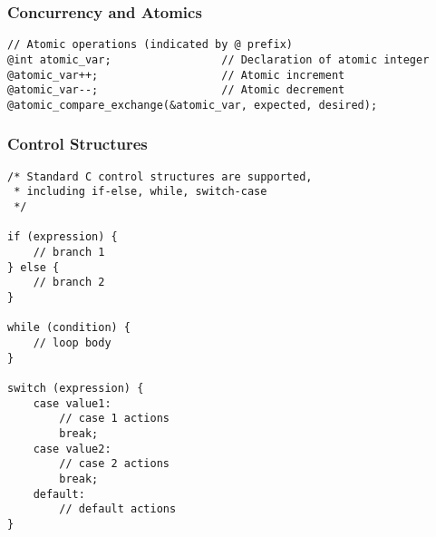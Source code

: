 \documentclass[12pt,a4paper]{article} %
\begin{document}
\subsubsection*{Concurrency and Atomics}
\begin{verbatim}
// Atomic operations (indicated by @ prefix)
@int atomic_var;                 // Declaration of atomic integer
@atomic_var++;                   // Atomic increment
@atomic_var--;                   // Atomic decrement
@atomic_compare_exchange(&atomic_var, expected, desired);

\end{verbatim}

\subsubsection*{Control Structures}
\begin{verbatim}
/* Standard C control structures are supported,
 * including if-else, while, switch-case
 */

if (expression) {
    // branch 1
} else {
    // branch 2
}

while (condition) {
    // loop body
}

switch (expression) {
    case value1:
        // case 1 actions
        break;
    case value2:
        // case 2 actions
        break;
    default:
        // default actions
}

\end{verbatim}
\end{document}
